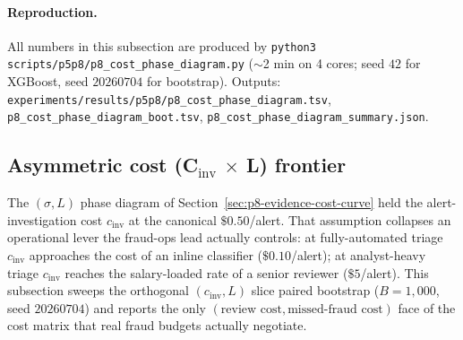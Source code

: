 \documentclass{article}
\providecommand{\secref}[1]{Section~\ref{#1}}
\begin{document}
\paragraph{Reproduction.} All numbers in this subsection are produced
by \texttt{python3 scripts/p5p8/p8\_cost\_phase\_diagram.py} ($\sim$2 min
on 4 cores; seed $42$ for XGBoost, seed $20260704$ for bootstrap).
Outputs:
\texttt{experiments/results/p5p8/p8\_cost\_phase\_diagram.tsv},
\texttt{p8\_cost\_phase\_diagram\_boot.tsv},
\texttt{p8\_cost\_phase\_diagram\_summary.json}.

\subsection{Asymmetric cost (C$_\text{inv}$ $\times$ L) frontier}
\label{sec:p8-asymm-cost}

The $(\sigma, L)$ phase diagram of \secref{sec:p8-evidence-cost-curve}
held the alert-investigation cost $c_\text{inv}$ at the canonical
$\$0.50$/alert. That assumption collapses an operational lever the
fraud-ops lead actually controls: at fully-automated triage
$c_\text{inv}$ approaches the cost of an inline classifier
($\$0.10$/alert); at analyst-heavy triage $c_\text{inv}$ reaches the
salary-loaded rate of a senior reviewer ($\$5$/alert). This subsection
sweeps the orthogonal $(c_\text{inv}, L)$ slice paired bootstrap ($B{=}1{,}000$,
seed $20260704$) and reports the only $(\text{review cost},
\text{missed-fraud cost})$ face of the cost matrix that real fraud
budgets actually negotiate.
\end{document}
